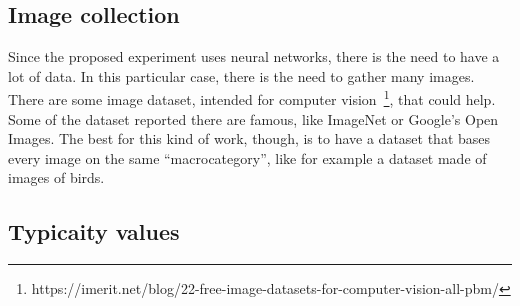 \documentclass[conference]{IEEEtran}
\begin{document}
	\subsection{Image collection}
		Since the proposed experiment uses neural networks, there is the need to have a lot of data. In this particular case, there is the need to gather many images. There are some image dataset, intended for computer 
		vision~\footnote{https://imerit.net/blog/22-free-image-datasets-for-computer-vision-all-pbm/}, that could help. Some of the dataset reported there are famous, like ImageNet or Google's Open Images. The 
		best for this kind of work, though, is to have a dataset that bases every image on the same ``macrocategory'', like for example a dataset made of images of birds.
	
	\subsection{Typicaity values}
		



\nocite{*}
\printbibliography
\end{document}
